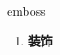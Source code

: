 
\begin{frame}
{\huge emboss}
\begin{center}
\begin{enumerate}\Large
  \item \textbf{装饰}
\end{enumerate}
\end{center}
\end{frame}
